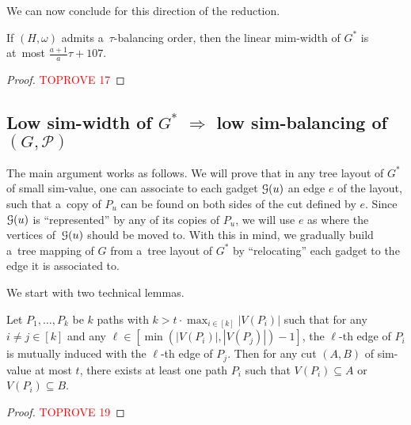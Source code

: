 \documentclass[a4paper,UKenglish,cleveref,hyperref,autoref]{lipics-v2021}
\renewcommand{\leq}{\leqslant}
\renewcommand{\le}{\leq}
\newcommand{\tmap}{tree mapping\xspace}
\begin{document}
We can now conclude for this direction of the reduction.

\begin{lemma}
If $(H, \omega)$ admits a~$\tau$-balancing order, then the linear mim-width of $G^*$ is at~most $\frac{a+1}{a} \tau + 107$.
\end{lemma}
\begin{proof}\textcolor{red}{TOPROVE 17}\end{proof}


\subsection{Low sim-width of $G^*$ $\Rightarrow$ low sim-balancing of~$(G,\mathcal P)$}\label{sec:sim-width-to-sim-balancing}



The main argument works as follows.
We will prove that in any tree layout of $G^*$ of small sim-value, one can associate to each gadget $\mathcal G(u)$ an edge $e$ of the layout, such that a~copy of $P_u$ can be found on both sides of the cut defined by $e$.
Since $\mathcal G(u)$ is ``represented'' by any of its copies of $P_u$, we will use $e$ as where the vertices of~$\mathcal G(u)$ should be moved to.
With this in mind, we gradually build a~\tmap of $G$ from a~tree layout of $G^*$ by ``relocating'' each gadget to the edge it is associated to.

We start with two technical lemmas.

\begin{lemma}\label{lem:cut-doesnt-cut}
Let $P_1, \dots, P_k$ be $k$ paths with $k > t \cdot \max_{i \in [k]} |V(P_i)|$ such that for any $i \neq j \in [k]$ and any $\ell \in [\min(|V(P_i)|,|V(P_j)|)-1]$, the $\ell$-th edge of $P_i$ is mutually induced with the $\ell$-th edge of $P_j$.
Then for any cut $(A, B)$ of sim-value at most $t$, there exists at least one path $P_i$ such that $V(P_i)\subseteq A$ or $V(P_i)\subseteq B$.
\end{lemma}
\begin{proof}\textcolor{red}{TOPROVE 19}\end{proof}
\end{document}
